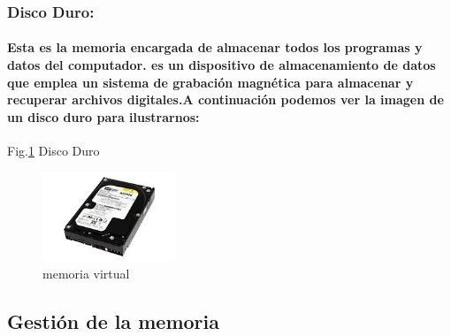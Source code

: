 \documentclass{article}
\begin{document}
\subsubsection{Disco Duro:}

\paragraph{Esta es la memoria encargada de almacenar todos los programas y datos del computador. es un dispositivo de almacenamiento de datos que emplea un sistema de grabación magnética para almacenar y recuperar archivos digitales.\cite{disco}A continuación podemos ver la imagen de un disco duro para ilustrarnos:}

Fig.\ref{fig:disco duro} Disco Duro
    \begin{figure}[h]
    \includegraphics[width=4cm]{disco duro.jpg}
    \centering
    \caption{memoria virtual}
    \label{fig:disco duro}
    \end{figure}
\subsection{Gestión de la memoria}
\end{document}
